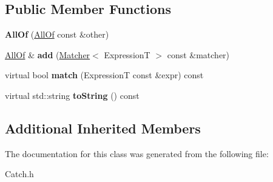 \subsection*{Public Member Functions}
\begin{DoxyCompactItemize}
\item 
\hypertarget{class_catch_1_1_matchers_1_1_impl_1_1_generic_1_1_all_of_a31f7c5e570e79bdf64064ee87c331a59}{{\bfseries All\-Of} (\hyperlink{class_catch_1_1_matchers_1_1_impl_1_1_generic_1_1_all_of}{All\-Of} const \&other)}\label{class_catch_1_1_matchers_1_1_impl_1_1_generic_1_1_all_of_a31f7c5e570e79bdf64064ee87c331a59}

\item 
\hypertarget{class_catch_1_1_matchers_1_1_impl_1_1_generic_1_1_all_of_a8c5cd1e494ab697076da418ee72ac297}{\hyperlink{class_catch_1_1_matchers_1_1_impl_1_1_generic_1_1_all_of}{All\-Of} \& {\bfseries add} (\hyperlink{struct_catch_1_1_matchers_1_1_impl_1_1_matcher}{Matcher}$<$ Expression\-T $>$ const \&matcher)}\label{class_catch_1_1_matchers_1_1_impl_1_1_generic_1_1_all_of_a8c5cd1e494ab697076da418ee72ac297}

\item 
\hypertarget{class_catch_1_1_matchers_1_1_impl_1_1_generic_1_1_all_of_a04534d0ac9e089f4500c3c19054f11ce}{virtual bool {\bfseries match} (Expression\-T const \&expr) const }\label{class_catch_1_1_matchers_1_1_impl_1_1_generic_1_1_all_of_a04534d0ac9e089f4500c3c19054f11ce}

\item 
\hypertarget{class_catch_1_1_matchers_1_1_impl_1_1_generic_1_1_all_of_a9febc1e67acbeff62a32bcbfdc0c8fab}{virtual std\-::string {\bfseries to\-String} () const }\label{class_catch_1_1_matchers_1_1_impl_1_1_generic_1_1_all_of_a9febc1e67acbeff62a32bcbfdc0c8fab}

\end{DoxyCompactItemize}
\subsection*{Additional Inherited Members}


The documentation for this class was generated from the following file\-:\begin{DoxyCompactItemize}
\item 
Catch.\-h\end{DoxyCompactItemize}
